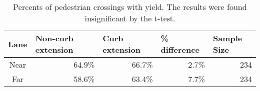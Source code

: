 \begin{table}[!htbp]
\centering
\begin{tabular}{@{}crrrr@{}}
\toprule
\multicolumn{1}{l}{Lane} & \multicolumn{1}{l}{Non-curb extension} & \multicolumn{1}{l}{Curb extension} & \multicolumn{1}{l}{\% difference} & \multicolumn{1}{l}{Sample Size} \\ \midrule
Near                     & 64.9\%                                 & 66.7\%                             & 2.7\%                             & 234                             \\
Far                      & 58.6\%                                 & 63.4\%                             & 7.7\%                             & 234                            \\
\bottomrule
\end{tabular}
\caption{Percents of pedestrian crossings with yield. The results were found insignificant by the t-test.}\label{table:motorist-yielded}
\end{table}
